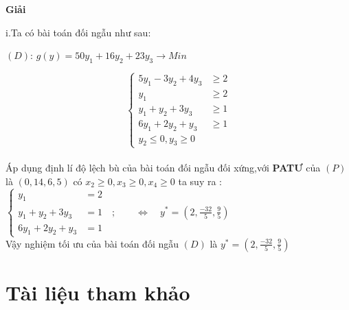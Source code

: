 \documentclass{article}
\begin{document}
\begin{center}
    \textbf{Giải}
\end{center}
    i.Ta có bài toán đối ngẫu như sau:\\
    \begin{center}
         $\left(D\right)$: $g(y)=50y_1+16y_2+23y_3 \longrightarrow  Min$\\
    \end{center}
     \[\left\{\begin{aligned}
        5y_1-3y_2+4y_3&\geq2 \\
        y_1&\geq2 \\
        y_1+y_2+3y_3&\geq1 \\
        6y_1+2y_2+y_3&\geq1 \\
        y_2\leq 0,y_3\geq 0
     \end{aligned}\right.\]\\
     Áp dụng định lí độ lệch bù của bài toán đối ngẫu đối xứng,với \textbf{PATƯ} của $\left(P\right)$ là $\left(0,14,6,5\right)$ có $x_2\geq 0,x_3\geq 0,x_4\geq 0$ ta suy ra :$\left\{\begin{aligned} 
        y_1&=2 \\
        y_1+y_2+3y_3&=1\quad;\qquad  \Longleftrightarrow \quad y^*=\left(2,\frac{-32}{5},\frac{9}{5}\right)\\
        6y_1+2y_2+y_3&=1 
     \end{aligned}\right.$\\
     Vậy nghiệm tối ưu của bài toán đối ngẫu $\left(D\right)$ là $y^*=\left(2,\frac{-32}{5},\frac{9}{5}\right)$

\section{Tài liệu tham khảo}



\end{document}
